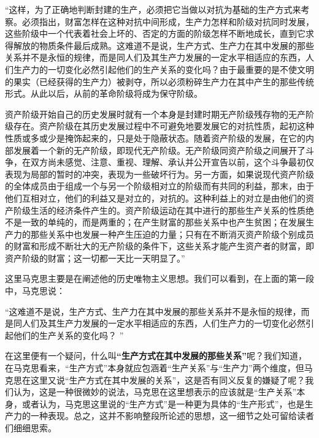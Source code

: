 \documentclass[a4paper,twoside,12pt,AutoFakeBold]{ctexart}
\begin{document}
\begin{adjustwidth}{2em}{2em}
    \qquad\fangsong
 “这样，为了正确地判断封建的生产，必须把它当做以对抗为基础的生产方式来考察。必须指出，财富怎样在这种对抗中间形成，生产力怎样和阶级对抗同时发展，这些阶级中一个代表着社会上坏的、否定的方面的阶级怎样不断地成长，直到它求得解放的物质条件最后成熟。这难道不是说，生产方式、生产力在其中发展的那些关系并不是永恒的规律，而是同人们及其生产力发展的一定水平相适应的东西，人们生产力的一切变化必然引起他们的生产关系的变化吗？由于最重要的是不使文明的果实（已经获得的生产力）被剥夺，所以必须粉碎生产力在其中产生的那些传统形式。从此以后，从前的革命阶级将成为保守阶级。

资产阶级开始自己的历史发展时就有一个本身是封建时期无产阶级残存物的无产阶级存在。资产阶级在其历史发展过程中不可避免地要发展它的对抗性质，起初这种性质或多或少是掩饰起来的，只是处于隐蔽状态。随着资产阶级的发展，在它的内部发展着一个新的无产阶级，即现代无产阶级。无产阶级同资产阶级之间展开了斗争，在双方尚未感觉、注意、重视、理解、承认并公开宣告以前，这个斗争最初仅表现为局部的暂时的冲突，表现为一些破坏行为。另一方面，如果说现代资产阶级的全体成员由于组成一个与另一个阶级相对立的阶级而有共同的利益，那末，由于他们互相对立，他们的利益又是对立的，对抗的。这种利益上的对立是由他们的资产阶级生活的经济条件产生的。资产阶级运动在其中进行的那些生产关系的性质绝不是一致的单纯的，而是两重的；在产生财富的那些关系中也产生贫困；在发展生产力的那些关系中也发展一种产生压迫的力量；只有在不断消灭资产阶级个别成员的财富和形成不断壮大的无产阶级的条件下，这些关系才能产生资产者的财富，即资产阶级的财富；这一切都一天比一天明显了。”
\end{adjustwidth}

这里马克思主要是在阐述他的历史唯物主义思想。我们可以看到，在上面的第一段中，马克思说：
\begin{adjustwidth}{2em}{2em}
    \qquad\fangsong
    “这难道不是说，生产方式、生产力在其中发展的那些关系并不是永恒的规律，而是同人们及其生产力发展的一定水平相适应的东西，人们生产力的一切变化必然引起他们的生产关系的变化吗？ ”
\end{adjustwidth}

在这里便有一个疑问，什么叫\textbf{“生产方式在其中发展的那些关系”}呢？我们知道，在马克思看来，“生产方式”本身就应包涵着“生产关系”与“生产力”两个维度，但马克思在这里又说“生产方式在其中发展的关系”，这是否有同义反复的嫌疑了呢？我们认为，这是一种很微妙的说法，马克思在这里想表示的应该就是“生产关系”本身，或者认为，马克思这里说的“生产方式”是一种更为具体的“生产形式”，也是生产力的一种表现。总之，这并不影响整段所论述的思想，这一细节之处可留给读者们细细思索。
\end{document}
